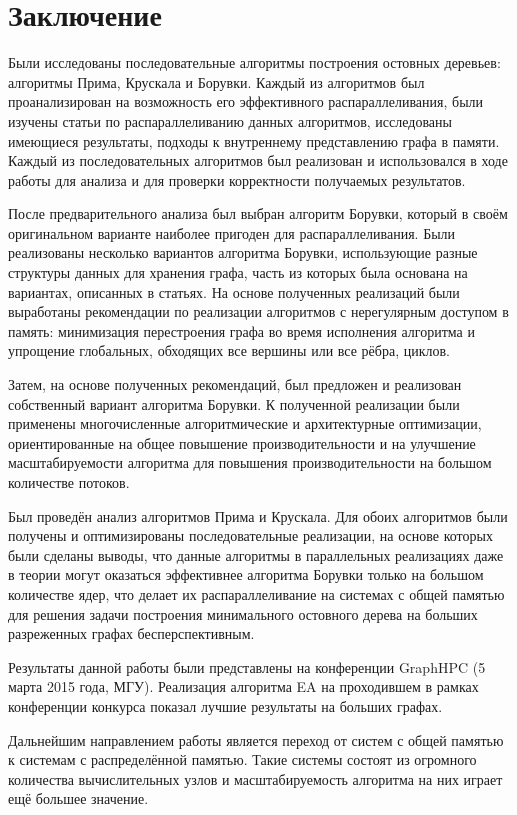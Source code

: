 \documentclass[a4paper,12pt]{extarticle}
\let\stdsection\section
\renewcommand\section{
    \newpage
    \stdsection
}
\begin{document}
\section{Заключение}
\label{sec:conclusion}

Были исследованы последовательные алгоритмы построения остовных деревьев: алгоритмы Прима, Крускала и Борувки. 
Каждый из алгоритмов был проанализирован на возможность его эффективного распараллеливания, были изучены статьи по распараллеливанию данных алгоритмов, исследованы имеющиеся результаты, подходы к внутреннему представлению графа в памяти.
Каждый из последовательных алгоритмов был реализован и использовался в ходе работы для анализа и для проверки корректности получаемых результатов.

После предварительного анализа был выбран алгоритм Борувки, который в своём оригинальном варианте наиболее пригоден для распараллеливания.
Были реализованы несколько вариантов алгоритма Борувки, использующие разные структуры данных для хранения графа, часть из которых была основана на вариантах, описанных в статьях.
На основе полученных реализаций были выработаны рекомендации по реализации алгоритмов с нерегулярным доступом в память: минимизация перестроения графа во время исполнения алгоритма и упрощение глобальных, обходящих все вершины или все рёбра, циклов.

Затем, на основе полученных рекомендаций, был предложен и реализован собственный вариант алгоритма Борувки.
К полученной реализации были применены многочисленные алгоритмические и архитектурные оптимизации, ориентированные на общее повышение производительности и на улучшение масштабируемости алгоритма для повышения производительности на большом количестве потоков.

Был проведён анализ алгоритмов Прима и Крускала.
Для обоих алгоритмов были получены и оптимизированы последовательные реализации, на основе которых были сделаны выводы, что данные алгоритмы в параллельных реализациях даже в теории могут оказаться эффективнее алгоритма Борувки только на большом количестве ядер, что делает их распараллеливание на системах с общей памятью для решения задачи построения минимального остовного дерева на больших разреженных графах бесперспективным.

Результаты данной работы были представлены на конференции GraphHPC (5 марта 2015 года, МГУ).
Реализация алгоритма EA на проходившем в рамках конференции конкурса показал лучшие результаты на больших графах.

Дальнейшим направлением работы является переход от систем с общей памятью к системам с распределённой памятью.
Такие системы состоят из огромного количества вычислительных узлов и масштабируемость алгоритма на них играет ещё большее значение.
\end{document}
